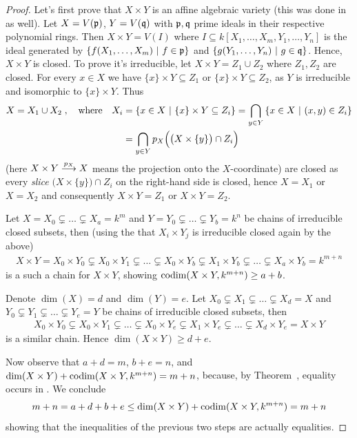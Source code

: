 \documentclass[a4paper,parskip=half,numbers=enddot, DIV=12]{scrreprt}
\begin{document}
\begin{proof}
	Let's first prove that $X\times Y$ is an affine algebraic variety (this was done in \cite[proof of Proposition~2.2.6]{alg1} as well). Let $X=V(\mathfrak{p})$, $Y=V(\mathfrak{q})$ with $\mathfrak{p},\mathfrak{q}$ prime ideals in their respective polynomial rings. Then $X\times Y=V(I)$ where $I\subseteq k[X_1,\ldots,X_m,Y_1,\ldots,Y_n]$ is  the ideal generated by $\left\{f(X_1,\ldots,X_m)\ \middle|\  f\in\mathfrak{p}\right\}$ and $\left\{g(Y_1,\ldots,Y_n)\ \middle|\  g\in\mathfrak{q}\right\}$. Hence, $X\times Y$ is closed.
    To prove it's irreducible, let $X\times Y = Z_1\cup Z_2$ where $Z_1,Z_2$ are closed. For every $x\in X$ we have $\{x\}\times Y\subseteq Z_1$ or $\{x\}\times Y\subseteq Z_2$, as $Y$ is irreducible and isomorphic to $\{x\}\times Y$. Thus 
    \begin{align*}
    	X= X_1\cup X_2\;,\quad\text{where}\quad X_i&=\left\{x\in X\ \middle|\  \{x\}\times Y\subseteq Z_i\right\} = \bigcap_{y\in Y}\left\{x\in X\ \middle|\  (x,y)\in Z_i\right\}\\
    	&=\bigcap_{y\in Y} p_X\Big(\big(X\times\{y\}\big)\cap Z_i\Big)
    \end{align*}
    (here $X\times Y\morphism[p_X] X$ means the projection onto the $X$-coordinate) are closed as every \emph{slice} $\big(X\times\{y\}\big)\cap Z_i$ on the right-hand side is closed, hence $X=X_1$ or $X=X_2$ and consequently $X\times Y = Z_1$ or $X\times Y=Z_2$.
    
	Let $X= X_0\subsetneq \ldots\subsetneq X_a=k^m$ and $Y= Y_0\subsetneq \ldots\subsetneq Y_b=k^n$ be chains of irreducible closed subsets, then (using the that $X_i\times Y_j$ is irreducible closed again by the above)
    \begin{align*}
        X\times Y = X_0\times Y_0 \subsetneq X_0\times Y_1\subsetneq\ldots\subsetneq X_0\times Y_b\subsetneq X_1\times Y_b\subsetneq \ldots\subsetneq X_a\times Y_b = k^{m+n}
    \end{align*}
    is a such a chain for $X\times Y$, showing $\operatorname{codim}(X\times Y,k^{m+n})\geq a+b$.
    
	Denote $\dim (X)=d$ and $\dim (Y)=e$. Let $X_0\subsetneq X_1\subsetneq \ldots\subsetneq X_d=X$ and $Y_0\subsetneq Y_1\subsetneq \ldots\subsetneq Y_e=Y$ be chains of irreducible closed subsets, then 
    \begin{align*}
        X_0\times Y_0 \subsetneq X_0\times Y_1\subsetneq\ldots\subsetneq X_0\times Y_e\subsetneq X_1\times Y_e\subsetneq \ldots\subsetneq X_d\times Y_e =X \times Y
    \end{align*}
    is a similar chain. Hence $\dim(X\times Y)\geq d+e$.
    
    Now observe that $a+d=m$, $b+e=n$, and $\dim(X\times Y)+\operatorname{codim}(X\times Y,k^{m+n}) = m+n$, because, by Theorem~, equality occurs in . We conclude
    \begin{align*}
        m+n = a+d+b+e \leq \dim(X\times Y) +\operatorname{codim}(X\times Y,k^{m+n}) = m+n
    \end{align*}
    showing that the inequalities of the previous two steps are actually equalities.
\end{proof}
\end{document}
